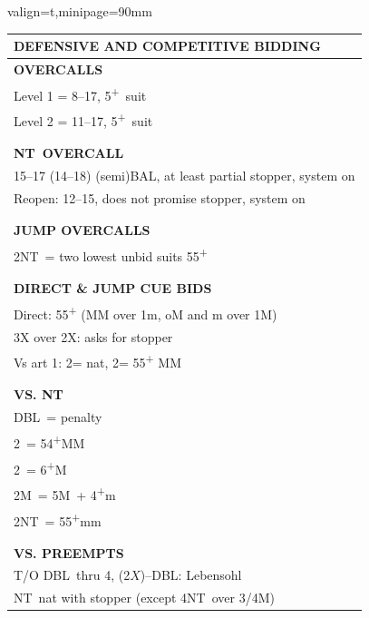 \documentclass{article}
\newcommand{\C}{\texorpdfstring{\textcolor{ForestGreen}{\raisebox{-0.017em}{\ensuremath{\varclub}}}}{C}}
\newcommand{\D}{\texorpdfstring{\textcolor{YellowOrange}{\raisebox{-0.35pt}{\ensuremath{\vardiamond}}}}{D}}
\renewcommand{\H}{\texorpdfstring{\textcolor{Red}{\raisebox{-0.06em}{\ensuremath{\varheart}}}}{H}}
\newcommand\N{{\footnotesize NT}}
\newcommand{\+}{\textsuperscript{+}}
\newcommand{\X}{{\footnotesize{DBL}}}
\newcommand{\m}{m}
\newcommand{\M}{M}
\newcommand{\MM}{MM}
\begin{document}
\newpage
\noindent
\small
  \begin{adjustbox}{valign=t,minipage={90mm}}
    \begin{tabular}{|p{88mm}|}
      \hline
      \cellcolor[gray]{0.9} \textbf{DEFENSIVE AND COMPETITIVE BIDDING} \\ \hline
      \textbf{OVERCALLS} \\ \hline
      Level 1 = 8--17, 5\+\ suit\\
      Level 2 = 11--17, 5\+\ suit\\
      \\
      \\
      \hline
      \textbf{\N \ OVERCALL} \\ \hline
      15--17 (14--18) (semi)BAL, at least partial stopper, system on\\
      Reopen: 12--15, does not promise stopper, system on\\
      \\
      \\
      \hline
      \textbf{JUMP OVERCALLS} \\ \hline
      2\N\ = two lowest unbid suits 55\+\\
      \\
      \\
      \hline
      \textbf{DIRECT \& JUMP CUE BIDS} \\ \hline
      Direct: 55\+ (MM over 1m, oM and m over 1M)\\
      3X over 2X: asks for stopper\\
      Vs art 1\D: 2\D = nat, 2\H = 55\+ MM\\
      \\
      \\
      \hline
      \textbf{VS. NT} \\ \hline
      \X\ = penalty \\
      2\C\ = 54\+MM \\
      2\D\ = 6\+\M \\
      2\M\ = 5\M\ + 4\+\m\\
      2\N\ = 55\+mm \\
      \\
      \\
      \hline
      \textbf{VS. PREEMPTS} \\ \hline
      T/O \X\ thru 4\D, (2$X$)--\X: Lebensohl\\
      \N\ nat with stopper (except 4\N\ over 3/4\M)\\

\end{tabular}
\end{adjustbox}
\end{document}

